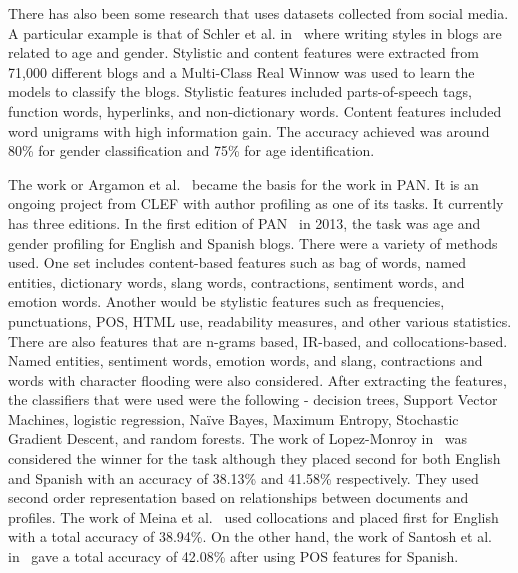 \documentclass[a4paper]{llncs}
\begin{document}
There has also been some research that uses datasets collected from social media. A particular example is that of Schler et al. in~\cite{schler2006effects} where writing styles in blogs are related to age and gender. Stylistic and content features were extracted from 71,000 different blogs and a Multi-Class Real Winnow was used to learn the models to classify the blogs. Stylistic features included parts-of-speech tags, function words, hyperlinks, and non-dictionary words. Content features included word unigrams with high information gain. The accuracy achieved was around 80\% for gender classification and 75\% for age identification.  

The work or Argamon et al.~\cite{argamon2009automatically} became the basis for the work in PAN. It is an ongoing project from CLEF with author profiling as one of its tasks. It currently has three editions. In the first edition of PAN~\cite{rangel2013overview} in 2013, the task  was age and gender profiling for English and Spanish blogs. There were a variety of methods used. One set includes content-based features such as bag of words, named entities, dictionary words, slang words, contractions, sentiment words, and emotion words. Another would be stylistic features such as frequencies, punctuations, POS, HTML use, readability measures, and other various statistics. There are also features that are n-grams based, IR-based, and collocations-based. Named entities, sentiment words, emotion words, and slang, contractions and words with character flooding were also considered. After extracting the features, the classifiers that were used were the following - decision trees, Support Vector Machines, logistic regression, Naïve Bayes, Maximum Entropy, Stochastic Gradient Descent, and random forests. The work of Lopez-Monroy in~\cite{lopez2013inaoe} was considered the winner for the task although they placed second for both English and Spanish with an accuracy of 38.13\% and 41.58\% respectively. They used second order representation based on relationships between documents and profiles. The work of Meina et al.~\cite{meina2013ensemble} used collocations and placed first for English with a total accuracy of 38.94\%. On the other hand, the work of Santosh et al. in~\cite{santosh2013author} gave a total accuracy of 42.08\% after using POS features for Spanish.
\end{document}
